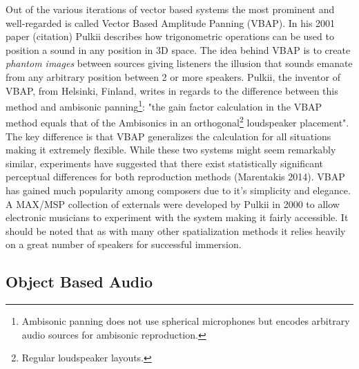 Out of the various iterations of vector based systems the most prominent and well-regarded is called Vector Based Amplitude Panning (VBAP). In his 2001 paper (citation) Pulkii describes how trigonometric operations can be used to position a sound in any position in 3D space. The idea behind VBAP is to create \textit{phantom images} between sources giving listeners the illusion that sounds emanate from any arbitrary position between 2 or more speakers. Pulkii, the inventor of VBAP, from Helsinki, Finland, writes in regards to the difference between this method and ambisonic panning\footnote{Ambisonic panning does not use spherical microphones but encodes arbitrary audio sources for ambisonic reproduction.}: "the gain factor calculation in the VBAP method equals that of the Ambisonics in an orthogonal\footnote{Regular loudspeaker layouts.} loudspeaker placement". The key difference is that VBAP generalizes the calculation for all situations making it extremely flexible. While these two systems might seem remarkably similar, experiments have suggested that there exist statistically significant perceptual differences for both reproduction methods (Marentakis 2014). VBAP has gained much popularity among composers due to it's simplicity and elegance. A MAX/MSP collection of externals were developed by Pulkii in 2000 to allow electronic musicians to experiment with the system making it fairly accessible. It should be noted that as with many other spatialization methods it relies heavily on a great number of speakers for successful immersion. 



\subsection{Object Based Audio}
\label{subsec:oba}

